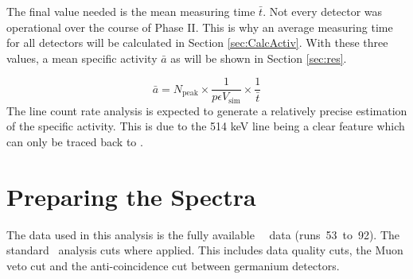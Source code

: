 \documentclass[encoding=utf8,british]{tumphthesis}
\begin{document}
The final value needed is the mean measuring time $\bar{t}$.
Not every detector was operational over the course of Phase II.
This is why an average measuring time for all detectors will be calculated in Section \ref{sec:CalcActiv}.
With these three values, a mean specific activity $\bar{a}$ as will be shown in Section \ref{sec:res}.

\begin{equation}
    \bar{a} = N_{\mathrm{peak}} \times \frac{1}{p \epsilon V_{\mathrm{sim}}} \times \frac{1}{\bar{t}}
    \label{equ:activityDieErste}
\end{equation}
The line count rate analysis is expected to generate a relatively precise estimation of the specific activity.
This is due to the 514 keV line being a clear feature which can only be traced back to \Kr.
\\

\section{Preparing the Spectra}
\label{sec:prep}

The data used in this analysis is the fully available \gerda\ \PII\ data (runs~53~to~92).
The standard \gerda\ analysis cuts where applied.
This includes data quality cuts, the Muon veto cut and the anti-coincidence cut between germanium detectors.
\\
\end{document}
